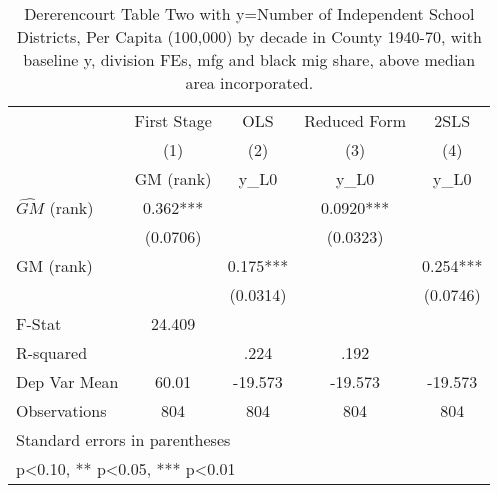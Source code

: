 \begin{table}[htbp]\centering
\def\sym#1{\ifmmode^{#1}\else\(^{#1}\)\fi}
\caption{Dererencourt Table Two with y=Number of Independent School Districts, Per Capita (100,000) by decade in County 1940-70, with baseline y, division FEs, mfg and black mig share, above median area incorporated.}
\begin{tabular}{l*{4}{c}}
\toprule
                    & First Stage   &         OLS   &Reduced Form   &        2SLS   \\
                    &\multicolumn{1}{c}{(1)}&\multicolumn{1}{c}{(2)}&\multicolumn{1}{c}{(3)}&\multicolumn{1}{c}{(4)}\\
                    &\multicolumn{1}{c}{GM  (rank)}&\multicolumn{1}{c}{y\_L0}&\multicolumn{1}{c}{y\_L0}&\multicolumn{1}{c}{y\_L0}\\
\midrule
$\hat{GM}$ (rank)   &       0.362***&               &      0.0920***&               \\
                    &    (0.0706)   &               &    (0.0323)   &               \\
\addlinespace
GM  (rank)          &               &       0.175***&               &       0.254***\\
                    &               &    (0.0314)   &               &    (0.0746)   \\
\midrule
F-Stat              &      24.409   &               &               &               \\
R-squared           &               &        .224   &        .192   &               \\
Dep Var Mean        &       60.01   &     -19.573   &     -19.573   &     -19.573   \\
Observations        &         804   &         804   &         804   &         804   \\
\bottomrule
\multicolumn{5}{l}{\footnotesize Standard errors in parentheses}\\
\multicolumn{5}{l}{\footnotesize * p<0.10, ** p<0.05, *** p<0.01}\\
\end{tabular}
\end{table}
